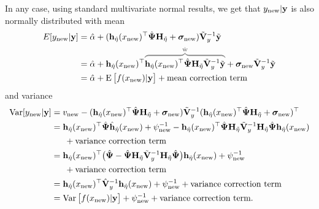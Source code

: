 In any case, using standard multivariate normal results, we get that $y_{\text{new}}|{\mathbf y}$ is also normally distributed with mean
\begin{align*}
  E[y_\new|\by] 
  &= \hat\alpha + (\bh_{\hat\eta}(x_\new)^\top\hat\bPsi\bH_{\tilde\eta} + \bsigma_\new)\tilde\bV_y^{-1}\tilde\by  \\
  &= \hat\alpha + \bh_{\hat\eta}(x_\new)^\top
  \myoverbrace{\bh_{\hat\eta}(x_\new)^\top\hat\bPsi\bH_{\tilde\eta}\tilde\bV_y^{-1}\tilde\by}{\hat\bw}
  + \bsigma_\new \tilde\bV_y^{-1}\tilde\by \\
  &= \hat\alpha + \E \big[ f(x_\new) |\by \big] + \text{mean correction term}
\end{align*}
and variance
\begin{align*}
  \operatorname{Var}[y_{\text{new}}|{\mathbf y}] 
  &= v_{\text{new}} - ({\mathbf h}_{\hat\eta}(x_{\text{new}})^\top\hat{{\bm\Psi}}{\mathbf H}_{\tilde\eta} + {\bm\sigma}_{\text{new}})\tilde{{\mathbf V}}_y^{-1}({\mathbf h}_{\hat\eta}(x_{\text{new}})^\top\hat{{\bm\Psi}}{\mathbf H}_{\tilde\eta} + {\bm\sigma}_{\text{new}})^\top \\
  &= {\mathbf h}_{\hat\eta}(x_{\text{new}})^\top \hat{{\bm\Psi}}\hat {{\mathbf h}}_{\hat\eta}(x_{\text{new}}) + \psi^{-1}_{\text{new}} - {\mathbf h}_{\hat\eta}(x_{\text{new}})^\top\hat{{\bm\Psi}}{\mathbf H}_{\tilde\eta}\tilde{{\mathbf V}}_y^{-1}{\mathbf H}_{\tilde\eta}\hat{{\bm\Psi}}{\mathbf h}_{\hat\eta}(x_{\text{new}}) \\
  &\phantom{==}+ \text{variance correction term} \\
  &= {\mathbf h}_{\hat\eta}(x_{\text{new}})^\top 
  \big(
  \hat{{\bm\Psi}} - \hat{{\bm\Psi}}{\mathbf H}_{\tilde\eta}\tilde{{\mathbf V}}_y^{-1}{\mathbf H}_{\tilde\eta}\hat{{\bm\Psi}}
  \big)
  {\mathbf h}_{\hat\eta}(x_{\text{new}}) + \psi^{-1}_{\text{new}} \\
  &\phantom{==} + \text{variance correction term} \\
  &= {\mathbf h}_{\hat\eta}(x_{\text{new}})^\top \hat{{\mathbf V}}_y^{-1}{\mathbf h}_{\hat\eta}(x_{\text{new}}) + \psi^{-1}_{\text{new}} + \text{variance correction term} \\
  &= \operatorname{Var}\big[f(x_{\text{new}})|{\mathbf y}\big] + \psi^{-1}_{\text{new}} + \text{variance correction term}.
\end{align*}